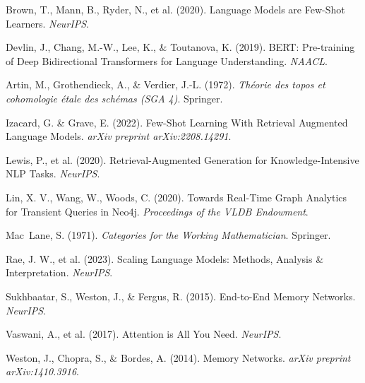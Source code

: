 \documentclass{article}
\begin{document}

\begin{thebibliography}{99}

Brown, T., Mann, B., Ryder, N., et al. (2020).
Language Models are Few-Shot Learners.
\emph{NeurIPS}.

Devlin, J., Chang, M.-W., Lee, K., \& Toutanova, K. (2019).
BERT: Pre-training of Deep Bidirectional Transformers for Language Understanding.
\emph{NAACL}.

Artin, M., Grothendieck, A., \& Verdier, J.-L. (1972).
\emph{Th\'eorie des topos et cohomologie \'etale des sch\'emas (SGA 4)}.
Springer.

Izacard, G. \& Grave, E. (2022).
Few-Shot Learning With Retrieval Augmented Language Models.
\emph{arXiv preprint arXiv:2208.14291}.

Lewis, P., et al. (2020).
Retrieval-Augmented Generation for Knowledge-Intensive NLP Tasks.
\emph{NeurIPS}.

Lin, X. V., Wang, W., Woods, C. (2020).
Towards Real-Time Graph Analytics for Transient Queries in Neo4j.
\emph{Proceedings of the VLDB Endowment}.

Mac~Lane, S. (1971).
\emph{Categories for the Working Mathematician}.
Springer.

Rae, J. W., et al. (2023).
Scaling Language Models: Methods, Analysis & Interpretation.
\emph{NeurIPS}.

Sukhbaatar, S., Weston, J., \& Fergus, R. (2015).
End-to-End Memory Networks.
\emph{NeurIPS}.

Vaswani, A., et al. (2017).
Attention is All You Need.
\emph{NeurIPS}.

Weston, J., Chopra, S., \& Bordes, A. (2014).
Memory Networks.
\emph{arXiv preprint arXiv:1410.3916}.

\end{thebibliography}
\end{document}
